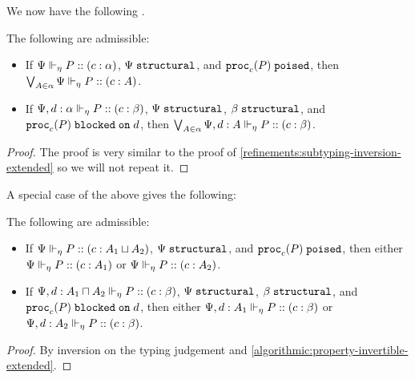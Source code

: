 
We now have the following .

\begin{lemma}
  \label{algorithmic:property-invertible-extended}
  The following are admissible:
  \begin{itemize}
    \item If ${\Psi} \Vdash_{\eta} P :: (c : \alpha)$, $\Psi\;\mathtt{structural}$, and $\mathtt{proc}_{c}(P)\;\mathtt{poised}$, then $\bigvee_{A \in \alpha}{{\Psi} \Vdash_{\eta} P :: (c : A)}$.
    \item If ${\Psi, d : \alpha} \Vdash_{\eta} P :: (c : \beta)$, $\Psi\;\mathtt{structural}$, $\beta\;\mathtt{structural}$, and ${\mathtt{proc}_{c}(P)}\;\mathtt{blocked\;on}\;{d}$, then $\bigvee_{A \in \alpha}{{\Psi, d : A} \Vdash_{\eta} P :: (c : \beta)}$.
  \end{itemize}
\end{lemma}
\begin{proof}
  The proof is very similar to the proof of \cref{refinements:subtyping-inversion-extended} so we will not repeat it.
\end{proof}

A special case of the above  gives the following:
\begin{corollary}
  \label{algorithmic:property-invertible-extended-corollary}
  The following are admissible:
  \begin{itemize}
    \item If ${\Psi} \Vdash_{\eta} P :: (c : A_1 \mathbin{\sqcup} A_2)$, $\Psi\;\mathtt{structural}$, and $\mathtt{proc}_{c}(P)\;\mathtt{poised}$, then either ${\Psi} \Vdash_{\eta} P :: (c : A_1)$ or ${\Psi} \Vdash_{\eta} P :: (c : A_2)$.
    \item If ${\Psi, d : A_1 \mathbin{\sqcap} A_2} \Vdash_{\eta} P :: (c : \beta)$, $\Psi\;\mathtt{structural}$, $\beta\;\mathtt{structural}$, and ${\mathtt{proc}_{c}(P)}\;\mathtt{blocked\;on}\;{d}$, then either ${\Psi, d : A_1} \Vdash_{\eta} P :: (c : \beta)$ or ${\Psi, d : A_2} \Vdash_{\eta} P :: (c : \beta)$.
  \end{itemize}
\end{corollary}
\begin{proof}
  By inversion on the typing judgement and \cref{algorithmic:property-invertible-extended}.
\end{proof}



